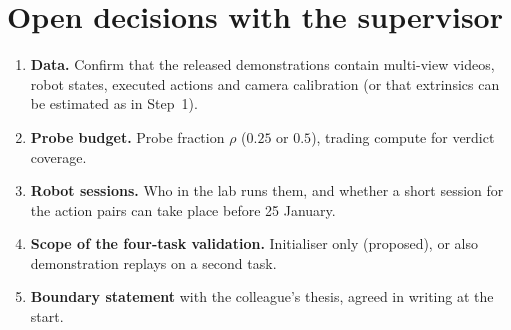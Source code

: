\section{Open decisions with the supervisor}\label{method:sec:decisions}
\begin{enumerate}
\item \textbf{Data.} Confirm that the released demonstrations contain multi-view videos, robot states, executed actions and camera calibration (or that extrinsics can be estimated as in Step~1).
\item \textbf{Probe budget.} Probe fraction $\rho$ ($0.25$ or $0.5$), trading compute for verdict coverage.
\item \textbf{Robot sessions.} Who in the lab runs them, and whether a short session for the action pairs can take place before 25 January.
\item \textbf{Scope of the four-task validation.} Initialiser only (proposed), or also demonstration replays on a second task.
\item \textbf{Boundary statement} with the colleague's thesis, agreed in writing at the start.
\end{enumerate}

\renewcommand{\thesection}{\thechapter.\arabic{section}}
